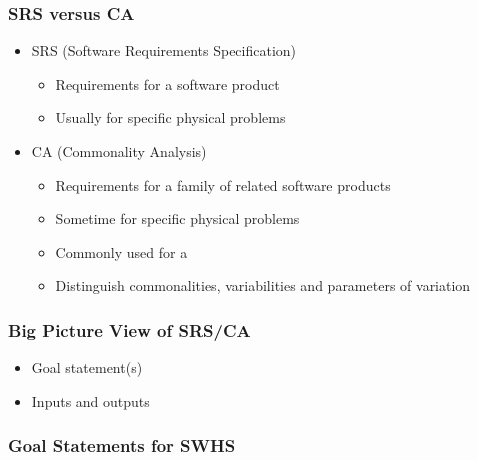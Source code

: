 \documentclass[t,12pt,numbers,fleqn]{beamer}
\begin{document}

\begin{frame}
\frametitle{SRS versus CA}

\begin{itemize}
\item SRS (Software Requirements Specification)
\begin{itemize}
\item Requirements for a software product
\item Usually for specific physical problems
\end{itemize}
\item CA (Commonality Analysis)
\begin{itemize}
\item Requirements for a family of related software products
\item Sometime for specific physical problems
\item Commonly used for a 
\item Distinguish commonalities, variabilities and parameters of variation
\end{itemize}

\end{itemize}

\end{frame}


\begin{frame}
\frametitle{Big Picture View of SRS/CA}

\begin{itemize}
\item Goal statement(s)
\item Inputs and outputs
\end{itemize}

\end{frame}


\begin{frame}
\frametitle{Goal Statements for SWHS}


\end{frame}

\end{document}
